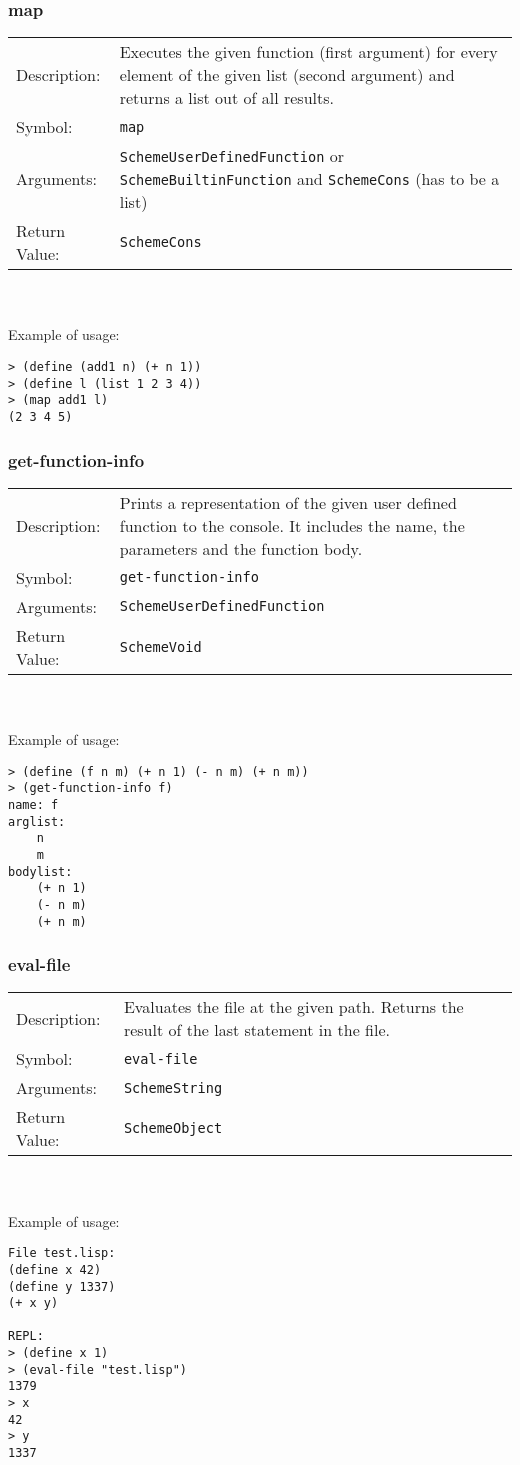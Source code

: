 \documentclass[12pt,a4paper]{scrartcl}
\begin{document}
\subsubsection{map}
\begin{tabular}{l  p{13cm}}
Description: & Executes the given function (first argument) for every element of the given list (second argument) and returns a list out of all results.\\
Symbol: & \lstinline{map}\\
Arguments: & \lstinline{SchemeUserDefinedFunction} or \lstinline{SchemeBuiltinFunction} and \lstinline{SchemeCons} (has to be a list)\\
Return Value: & \lstinline{SchemeCons}
\end{tabular}
\\
\\
Example of usage:
\begin{lstlisting}
> (define (add1 n) (+ n 1))
> (define l (list 1 2 3 4))
> (map add1 l)
(2 3 4 5)
\end{lstlisting}

\subsubsection{get-function-info}
\begin{tabular}{l p{13cm}}
Description: & Prints a representation of the given user defined function to the console. It includes the name, the parameters and the function body.\\
Symbol: & \lstinline{get-function-info}\\
Arguments: & \lstinline{SchemeUserDefinedFunction}\\
Return Value: & \lstinline{SchemeVoid}
\end{tabular}
\\
\\
Example of usage:
\begin{lstlisting}
> (define (f n m) (+ n 1) (- n m) (+ n m))
> (get-function-info f)
name: f
arglist:
	n
	m
bodylist:
	(+ n 1)
	(- n m)
	(+ n m)
\end{lstlisting}

\subsubsection{eval-file}
\begin{tabular}{l p{13cm}}
Description: & Evaluates the file at the given path. Returns the result of the last statement in the file.\\
Symbol: & \lstinline{eval-file}\\
Arguments: & \lstinline{SchemeString}\\
Return Value: & \lstinline{SchemeObject}
\end{tabular}
\\
\\
Example of usage:
\begin{lstlisting}
File test.lisp:
(define x 42)
(define y 1337)
(+ x y)

REPL:
> (define x 1)
> (eval-file "test.lisp")
1379
> x
42
> y
1337
\end{lstlisting}
\end{document}

